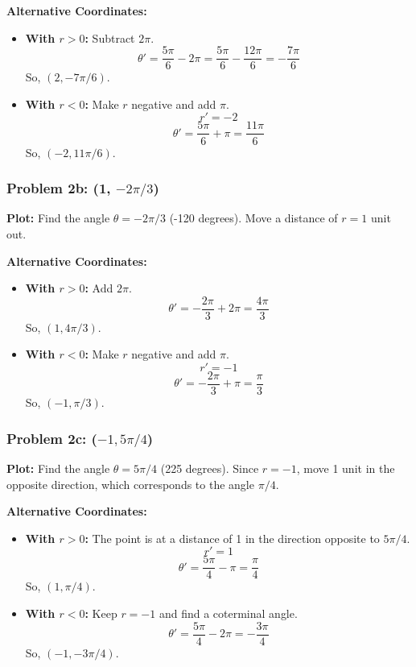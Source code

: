 \documentclass{article}
\begin{document}
\textbf{Alternative Coordinates:}
\begin{itemize}
    \item \textbf{With \(r > 0\):} Subtract \(2\pi\).
    \[ \theta' = \frac{5\pi}{6} - 2\pi = \frac{5\pi}{6} - \frac{12\pi}{6} = -\frac{7\pi}{6} \]
    So, \((2, -7\pi/6)\).

    \item \textbf{With \(r < 0\):} Make \(r\) negative and add \(\pi\).
    \[ r' = -2 \]
    \[ \theta' = \frac{5\pi}{6} + \pi = \frac{11\pi}{6} \]
    So, \((-2, 11\pi/6)\).
\end{itemize}

\subsubsection*{Problem 2b: (1, \(-2\pi/3\))}
\textbf{Plot:} Find the angle \(\theta = -2\pi/3\) (-120 degrees). Move a distance of \(r=1\) unit out.

\textbf{Alternative Coordinates:}
\begin{itemize}
    \item \textbf{With \(r > 0\):} Add \(2\pi\).
    \[ \theta' = -\frac{2\pi}{3} + 2\pi = \frac{4\pi}{3} \]
    So, \((1, 4\pi/3)\).

    \item \textbf{With \(r < 0\):} Make \(r\) negative and add \(\pi\).
    \[ r' = -1 \]
    \[ \theta' = -\frac{2\pi}{3} + \pi = \frac{\pi}{3} \]
    So, \((-1, \pi/3)\).
\end{itemize}

\subsubsection*{Problem 2c: (\(-1, 5\pi/4\))}
\textbf{Plot:} Find the angle \(\theta = 5\pi/4\) (225 degrees). Since \(r=-1\), move 1 unit in the opposite direction, which corresponds to the angle \(\pi/4\).

\textbf{Alternative Coordinates:}
\begin{itemize}
    \item \textbf{With \(r > 0\):} The point is at a distance of 1 in the direction opposite to \(5\pi/4\).
    \[ r' = 1 \]
    \[ \theta' = \frac{5\pi}{4} - \pi = \frac{\pi}{4} \]
    So, \((1, \pi/4)\).

    \item \textbf{With \(r < 0\):} Keep \(r=-1\) and find a coterminal angle.
    \[ \theta' = \frac{5\pi}{4} - 2\pi = -\frac{3\pi}{4} \]
    So, \((-1, -3\pi/4)\).
\end{itemize}
\end{document}
